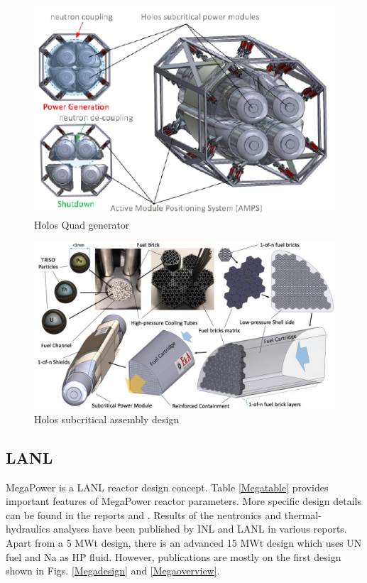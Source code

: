 \documentclass[10pt,a4paper]{article}
\begin{document}
\begin{figure}[hbtp]
\centering
\includegraphics[scale=1]{Figs/holosquad.jpeg}
\caption{Holos Quad generator}
\label{Holosquad}
\end{figure}

\begin{figure}[hbtp]
\centering
\includegraphics[scale=0.3]{Figs/holosfueldesign.jpeg}
\caption{Holos subcritical assembly design}
\label{Holosdesign}
\end{figure}

\pagebreak
\subsection{LANL}
MegaPower is a LANL reactor design concept. Table \ref{Megatable} provides important features of MegaPower reactor parameters. More specific design details can be found in the reports \cite{sterbentz_special_2017} and \cite{mcclure_design_2015}. Results of the neutronics and thermal-hydraulics analyses have been published by \gls{INL} and LANL in various reports. Apart from a 5 MWt design, there is an advanced 15 MWt design which uses UN fuel and Na as HP fluid. However, publications are mostly on the first design shown in Figs. \ref{Megadesign} and \ref{Megaoverview}. 
\end{document}
